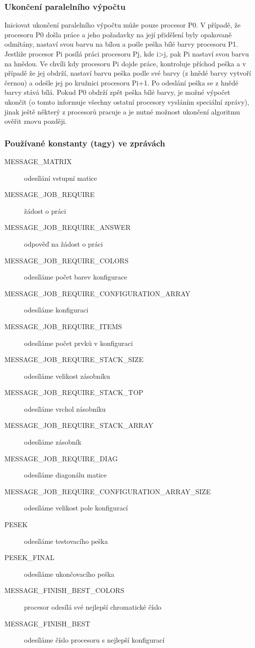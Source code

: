 \documentclass[12pt]{article}
\begin{document}
\subsubsection{Ukončení paralelního výpočtu}

Iniciovat ukončení paralelního výpočtu může pouze procesor P0. V případě, že procesoru P0 došla práce a jeho požadavky na její přidělení byly opakovaně odmítány, nastaví svou barvu na bílou a pošle peška bílé barvy procesoru P1. Jestliže procesor Pi posílá práci procesoru Pj, kde i>j, pak Pi nastaví svou barvu na hnědou. Ve chvíli kdy procesoru Pi dojde práce, kontroluje příchod peška a v případě že jej obdrží, nastaví barvu peška podle své barvy (z hnědé barvy vytvoří černou) a odešle jej po kružnici procesoru Pi+1. Po odeslání peška se z hnědé barvy stává bílá. Pokud P0 obdrží zpět peška bílé barvy, je možné výpočet ukončit (o tomto informuje všechny ostatní procesory vysláním speciální zprávy), jinak ještě některý z procesorů pracuje a je nutné možnost ukončení algoritmu ověřit znovu později.

\subsubsection{Používané konstanty (tagy) ve zprávách}
\begin{description}
\item[MESSAGE\_MATRIX] odesílání vstupní matice
\item[MESSAGE\_JOB\_REQUIRE] žádost o práci
\item[MESSAGE\_JOB\_REQUIRE\_ANSWER] odpověď na žádost o práci
\item[MESSAGE\_JOB\_REQUIRE\_COLORS] odesíláme počet barev konfigurace
\item[MESSAGE\_JOB\_REQUIRE\_CONFIGURATION\_ARRAY] odesíláme konfiguraci
\item[MESSAGE\_JOB\_REQUIRE\_ITEMS] odesíláme počet prvků v konfiguraci
\item[MESSAGE\_JOB\_REQUIRE\_STACK\_SIZE] odesíláme velikost zásobníku
\item[MESSAGE\_JOB\_REQUIRE\_STACK\_TOP] odesíláme vrchol zásobníku
\item[MESSAGE\_JOB\_REQUIRE\_STACK\_ARRAY] odesíláme zásobník
\item[MESSAGE\_JOB\_REQUIRE\_DIAG] odesíláme diagonálu matice
\item[MESSAGE\_JOB\_REQUIRE\_CONFIGURATION\_ARRAY\_SIZE] odesíláme velikost pole konfigurací
\item[PESEK] odesíláme testovacího peška
\item[PESEK\_FINAL] odesíláme ukončovacího peška
\item[MESSAGE\_FINISH\_BEST\_COLORS] procesor odesílá své nejlepší chromatické číslo
\item[MESSAGE\_FINISH\_BEST] odesíláme číslo procesoru s nejlepší konfigurací
\end{description}
\end{document}
